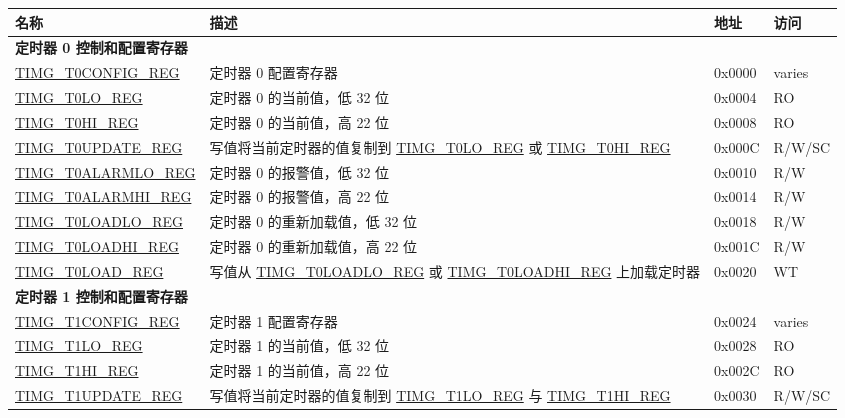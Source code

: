
\begin{longtable}{ | p{6cm} | p{7.2cm} | p{1.3cm} | p{1cm} | }
\hline\rowcolor{lightgray}
名称 & 描述 &  地址 & 访问 \\ \hline
\endhead
\multicolumn{4}{|l|}{\textbf{定时器 0 控制和配置寄存器}} \\ \hline
\hyperref[regdesc:TIMGTXCONFIGREG]{TIMG\_T0CONFIG\_REG} & 定时器 0 配置寄存器 & 0x0000 & varies \\ \hline
\hyperref[regdesc:TIMGTXLOREG]{TIMG\_T0LO\_REG} & 定时器 0 的当前值，低 32 位 & 0x0004 & RO \\ \hline
\hyperref[regdesc:TIMGTXHIREG]{TIMG\_T0HI\_REG} & 定时器 0 的当前值，高 22 位 & 0x0008 & RO \\ \hline
\hyperref[regdesc:TIMGTXUPDATEREG]{TIMG\_T0UPDATE\_REG} & 写值将当前定时器的值复制到 \hyperref[regdesc:TIMGTXLOREG]{TIMG\_T0LO\_REG} 或 \hyperref[regdesc:TIMGTXHIREG]{TIMG\_T0HI\_REG} & 0x000C & R/W/SC \\ \hline
\hyperref[regdesc:TIMGTXALARMLOREG]{TIMG\_T0ALARMLO\_REG} & 定时器 0 的报警值，低 32 位 & 0x0010 & R/W \\ \hline
\hyperref[regdesc:TIMGTXALARMHIREG]{TIMG\_T0ALARMHI\_REG} & 定时器 0 的报警值，高 22 位 & 0x0014 & R/W \\ \hline
\hyperref[regdesc:TIMGTXLOADLOREG]{TIMG\_T0LOADLO\_REG} & 定时器 0 的重新加载值，低 32 位 & 0x0018 & R/W \\ \hline
\hyperref[regdesc:TIMGTXLOADHIREG]{TIMG\_T0LOADHI\_REG} & 定时器 0 的重新加载值，高 22 位 & 0x001C & R/W \\ \hline
\hyperref[regdesc:TIMGTXLOADREG]{TIMG\_T0LOAD\_REG} & 写值从 \hyperref[regdesc:TIMGTXLOADLOREG]{TIMG\_T0LOADLO\_REG} 或 \hyperref[regdesc:TIMGTXLOADHIREG]{TIMG\_T0LOADHI\_REG} 上加载定时器 & 0x0020 & WT \\ \hline
\multicolumn{4}{|l|}{\textbf{定时器 1 控制和配置寄存器}} \\ \hline
\hyperref[regdesc:TIMGTXCONFIGREG]{TIMG\_T1CONFIG\_REG} & 定时器 1 配置寄存器 & 0x0024 & varies \\ \hline
\hyperref[regdesc:TIMGTXLOREG]{TIMG\_T1LO\_REG} & 定时器 1 的当前值，低 32 位 & 0x0028 & RO \\ \hline
\hyperref[regdesc:TIMGTXHIREG]{TIMG\_T1HI\_REG} & 定时器 1 的当前值，高 22 位 & 0x002C & RO \\ \hline
\hyperref[regdesc:TIMGTXUPDATEREG]{TIMG\_T1UPDATE\_REG} & 写值将当前定时器的值复制到 \hyperref[regdesc:TIMGTXLOREG]{TIMG\_T1LO\_REG} 与 \hyperref[regdesc:TIMGTXHIREG]{TIMG\_T1HI\_REG} & 0x0030 & R/W/SC \\ \hline

\end{longtable}
